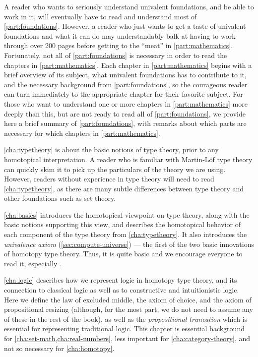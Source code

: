 A reader who wants to seriously understand univalent foundations, and be able to work in it, will eventually have to read and understand most of \autoref{part:foundations}.
However, a reader who just wants to get a taste of univalent foundations and what it can do may understandably balk at having to work through over 200 pages before getting to the ``meat'' in \autoref{part:mathematics}.
Fortunately, not all of \autoref{part:foundations} is necessary in order to read the chapters in \autoref{part:mathematics}.
Each chapter in \autoref{part:mathematics} begins with a brief overview of its subject, what univalent foundations has to contribute to it, and the necessary background from \autoref{part:foundations}, so the courageous reader can turn immediately to the appropriate chapter for their favorite subject.
For those who want to understand one or more chapters in \autoref{part:mathematics} more deeply than this, but are not ready to read all of \autoref{part:foundations}, we provide here a brief summary of \autoref{part:foundations}, with remarks about which parts are necessary for which chapters in \autoref{part:mathematics}.

\autoref{cha:typetheory} is about the basic notions of type theory, prior to any homotopical interpretation.
A reader who is familiar with Martin-L\"of type theory can quickly skim it to pick up the particulars of the theory we are using.
However, readers without experience in type theory will need to read \autoref{cha:typetheory}, as there are many subtle differences between type theory and other foundations such as set theory.

\autoref{cha:basics} introduces the homotopical viewpoint on type theory, along with the basic notions supporting this view, and describes the homotopical behavior of each component of the type theory from \autoref{cha:typetheory}.
It also introduces the \emph{univalence axiom} (\autoref{sec:compute-universe}) --- the first of the two basic innovations of homotopy type theory.
Thus, it is quite basic and we encourage everyone to read it, especially .

\autoref{cha:logic} describes how we represent logic in homotopy type theory, and its connection to classical logic as well as to constructive and intuitionistic logic.
Here we define the law of excluded middle, the axiom of choice, and the axiom of propositional resizing (although, for the most part, we do not need to assume any of these in the rest of the book), as well as the \emph{propositional truncation} which is essential for representing traditional logic.
This chapter is essential background for \autoref{cha:set-math,cha:real-numbers}, less important for \autoref{cha:category-theory}, and not so necessary for \autoref{cha:homotopy}.


